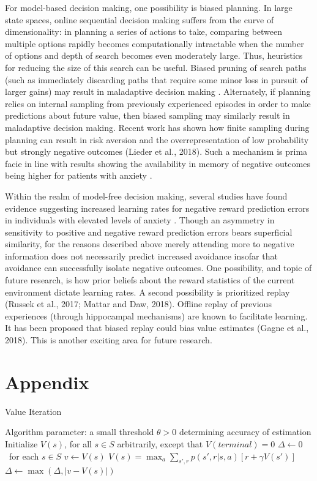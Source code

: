 \documentclass[11pt]{article} %
\begin{document}
For model-based decision making, one possibility is biased planning. In large state spaces, online sequential decision making suffers from the curve of dimensionality: in planning a series of actions to take, comparing between multiple options rapidly becomes computationally intractable when the number of options and depth of search becomes even moderately large. Thus, heuristics for reducing the size of this search can be useful. Biased pruning of search paths (such as immediately discarding paths that require some minor loss in pursuit of larger gains) may result in maladaptive decision making \citep{Huys2012}. Alternately, if planning relies on internal sampling from previously experienced episodes in order to make predictions about future value, then biased sampling may similarly result in maladaptive decision making. Recent work has shown how finite sampling during planning can result in risk aversion and the overrepresentation of low probability but strongly negative outcomes (Lieder et al., 2018). Such a mechanism is prima facie in line with results showing the availability in memory of negative outcomes being higher for patients with anxiety \citep{Borkovec1999, Miranda2007}.

Within the realm of model-free decision making, several studies have found evidence suggesting increased learning rates for negative reward prediction errors in individuals with elevated levels of anxiety \citep{Harle2017, Garrett2018}. Though an asymmetry in sensitivity to positive and negative reward prediction errors bears superficial similarity, for the reasons described above merely attending more to negative information does not necessarily predict increased avoidance insofar that avoidance can successfully isolate negative outcomes. One possibility, and topic of future research, is how prior beliefs about the reward statistics of the current environment dictate learning rates. A second possibility is prioritized replay (Russek et al., 2017; Mattar and Daw, 2018). Offline replay of previous experiences (through hippocampal mechanisms) are known to facilitate learning. It has been proposed that biased replay could bias value estimates (Gagne et al., 2018). This is another exciting area for future research.




\section{Appendix}

\begin{algorithm}
  \caption{Value Iteration}

  \State Algorithm parameter: a small threshold $\theta > 0$ determining accuracy of estimation
  \State Initialize $V(s)$, for all $s \in S$ arbitrarily, except that $V(terminal) = 0$
  \State
  \While{$\Delta > \theta$}
    \State $\Delta \leftarrow 0$
    \Loop \ for each $s \in S$
      \State $v \leftarrow V(s)$
      \State $ V(s) = \max_a \sum_{s',r} p(s',r|s,a) \left[ r + \gamma V(s') \right] $
      \State $\Delta \leftarrow \max(\Delta, |v - V(s)|)$
    \EndLoop
  \EndWhile

\end{algorithm}
\end{document}
